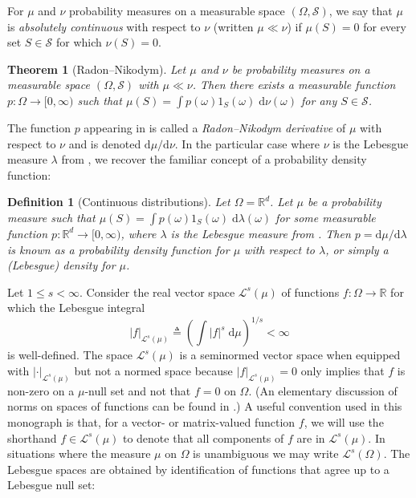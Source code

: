 \documentclass[12pt,paper=letter]{scrreprt}
\newtheorem{theorem}{Theorem}[chapter]
\newtheorem{definition}{Definition}[chapter]
\def\defeq{\triangleq} %
\begin{document}
For $\mu$ and $\nu$ probability measures on a measurable space $(\Omega,\mathcal{S})$, we say that $\mu$ is \emph{absolutely continuous} with respect to $\nu$ (written $\mu \ll \nu$) if $\mu(S) = 0$ for every set $S \in \mathcal{S}$ for which $\nu(S) = 0$.

\begin{theorem}[Radon--Nikodym]
\label{thm: radon nikodym}
    Let $\mu$ and $\nu$ be probability measures on a measurable space $(\Omega,\mathcal{S})$ with $\mu \ll \nu$.
    Then there exists a measurable function $p : \Omega \rightarrow [0,\infty)$ such that $\mu(S) = \int p(\omega) 1_S(\omega) \; \mathrm{d}\nu(\omega)$ for any $S \in \mathcal{S}$.
\end{theorem}

\noindent The function $p$ appearing in  is called a \emph{Radon--Nikodym derivative} of $\mu$ with respect to $\nu$ and is denoted $\mathrm{d}\mu / \mathrm{d} \nu$. 
In the particular case where $\nu$ is the Lebesgue measure $\lambda$ from , we recover the familiar concept of a probability density function:

\begin{definition}[Continuous distributions]
\label{def: cts disn}
Let $\Omega = \mathbb{R}^d$.
Let $\mu$ be a probability measure such that $\mu(S) = \int p(\omega) 1_S(\omega) \; \mathrm{d} \lambda(\omega)$ for some measurable function $p : \mathbb{R}^d \rightarrow [0,\infty)$, where $\lambda$ is the Lebesgue measure from .
Then $p = \mathrm{d}\mu / \mathrm{d}\lambda$ is known as a \emph{probability density function} for $\mu$ with respect to $\lambda$, or simply a \emph{(Lebesgue) density} for $\mu$. 
\end{definition}

Let $1 \leq s < \infty$.
Consider the real vector space $\mathcal{L}^s(\mu)$ of functions $f : \Omega \rightarrow \mathbb{R}$ for which the Lebesgue integral
$$
|f|_{\mathcal{L}^s(\mu)} \defeq \left( \int |f|^s \; \mathrm{d}\mu \right)^{1/s} < \infty
$$
is well-defined.
The space $\mathcal{L}^s(\mu)$ is a seminormed vector space when equipped with $|\cdot|_{\mathcal{L}^s(\mu)}$ but not a normed space because $|f|_{\mathcal{L}^s(\mu)} = 0$ only implies that $f$ is non-zero on a $\mu$-null set and not that $f = 0$ on $\Omega$.
(An elementary discussion of norms on spaces of functions can be found in .)
A useful convention used in this monograph is that, for a vector- or matrix-valued function $f$, we will use the shorthand $f \in \mathcal{L}^s(\mu)$ to denote that all components of $f$ are in $\mathcal{L}^s(\mu)$.
In situations where the measure $\mu$ on $\Omega$ is unambiguous we may write $\mathcal{L}^s(\Omega)$.
The Lebesgue spaces are obtained by identification of functions that agree up to a Lebesgue null set:
\end{document}
